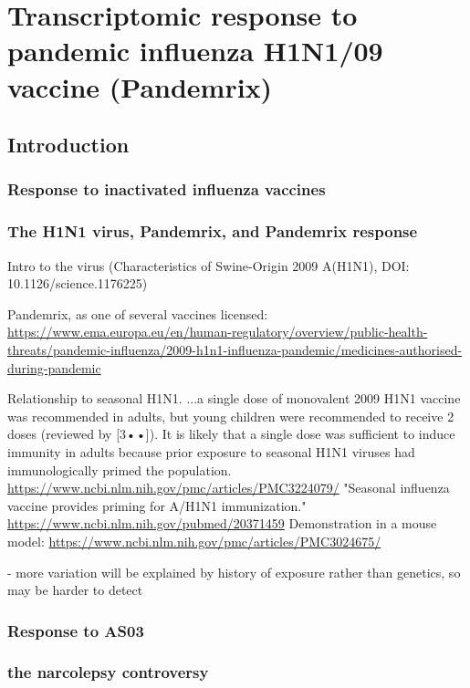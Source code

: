 %
%

\chapter{Transcriptomic response to pandemic influenza H1N1/09 vaccine (Pandemrix)}

\section{Introduction}

\subsection{Response to inactivated influenza vaccines}

\subsection{The H1N1 virus, Pandemrix, and Pandemrix response}

Intro to the virus (Characteristics of Swine-Origin 2009 A(H1N1), DOI: 10.1126/science.1176225)

Pandemrix, as one of several vaccines licensed: \url{https://www.ema.europa.eu/en/human-regulatory/overview/public-health-threats/pandemic-influenza/2009-h1n1-influenza-pandemic/medicines-authorised-during-pandemic}

Relationship to seasonal H1N1.
...a single dose of monovalent 2009 H1N1 vaccine was recommended in adults, but
young children were recommended to receive 2 doses (reviewed by [3••]). It is
likely that a single dose was sufficient to induce immunity in adults because
prior exposure to seasonal H1N1 viruses had immunologically primed the
population. \url{https://www.ncbi.nlm.nih.gov/pmc/articles/PMC3224079/}
"Seasonal influenza vaccine provides priming for A/H1N1 immunization." \url{https://www.ncbi.nlm.nih.gov/pubmed/20371459}
Demonstration in a mouse model: \url{https://www.ncbi.nlm.nih.gov/pmc/articles/PMC3024675/}

- more variation will be explained by history of exposure rather than genetics, so may be harder to detect

\subsection{Response to AS03}

\subsection{the narcolepsy controversy}

